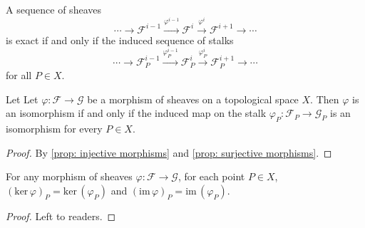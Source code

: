 \documentclass[11pt]{article}
\begin{document}
\begin{corollary}
    \cite[Ex 1.2]{hartsAG} 
    A sequence of sheaves 
    $$ \cdots \to \mathscr{F}^{i-1} \xrightarrow{\varphi^{i-1}} \mathscr{F}^{i} \xrightarrow{\varphi^{i}}\mathscr{F}^{i+1} \to \cdots $$ 
    is exact if and only if the induced sequence of stalks 
    $$ \cdots \to \mathscr{F}^{i-1}_{P} \xrightarrow{\varphi^{i-1}_{P}} \mathscr{F}^{i}_{P} \xrightarrow{\varphi^{i}_{P}}\mathscr{F}^{i+1}_{P} \to \cdots $$ 
    for all $ P \in X $.  
\end{corollary}

\begin{proposition}
    \label{prop: isomorphism of sheaves}
    \cite[Proposition 1.1]{hartsAG} 
    Let Let $\varphi: \mathscr{F} \to \mathscr{G}$ be a morphism of sheaves on a topological space $X$. 
    Then $\varphi$ is an isomorphism if and only if the 
    induced map on the stalk $\varphi_{P}: \mathscr{F}_{P} \to \mathscr{G}_{P}$ is 
    an isomorphism for every $P \in X$. 
\end{proposition}

\begin{proof}
    By \autoref{prop: injective morphisms} and \autoref{prop: surjective morphisms}. 
\end{proof}

\begin{proposition}
    \cite[Ex 1.2]{hartsAG} 
    For any morphism of sheaves $\varphi:\mathscr{F} \to \mathscr{G}$, 
    for each point $P \in X$, $(\mathrm{ker}\,\varphi)_{P}=\mathrm{ker}\,(\varphi_{P})$ 
    and $(\mathrm{im}\,\varphi)_{P}=\mathrm{im}\,(\varphi_{P})$. 
\end{proposition}

\begin{proof}
    Left to readers. 
\end{proof}


\printbibliography
\end{document}
